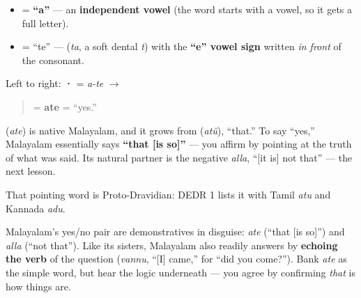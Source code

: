 \begin{itemize}
\raggedright
  \item \textbf{} = \textbf{\textquotedblleft{}a\textquotedblright{}} — an \textbf{independent vowel} (the word starts with a vowel, so it gets a full letter).
  \item \textbf{} = \textquotedblleft{}te\textquotedblright{} — \textbf{} (\emph{ta}, a soft dental \emph{t}) with the \textbf{\textquotedblleft{}e\textquotedblright{} vowel sign} written \emph{in front} of the consonant.
\end{itemize}

Left to right: \textbf{ · } = \emph{a-te} $\to$

\begin{quote}
\textbf{} = \textbf{ate} = \textquotedblleft{}yes.\textquotedblright{}
\end{quote}

\begin{cousinweb}
\textbf{} (\emph{ate}) is native Malayalam, and it grows from \textbf{} (\emph{atŭ}), \textquotedblleft{}that.\textquotedblright{} To say \textquotedblleft{}yes,\textquotedblright{} Malayalam essentially says \textbf{\textquotedblleft{}that {[}is so{]}\textquotedblright{}} — you affirm by pointing at the truth of what was said. Its natural partner is the negative \emph{alla}, \textquotedblleft{}{[}it is{]} not that\textquotedblright{} — the next lesson.

That pointing word is Proto-Dravidian: DEDR 1 lists it with Tamil \emph{atu} and Kannada \emph{adu}.
\end{cousinweb}

\begin{grammarlens}[title={Grammar Lens: yes and no as \textquotedblleft{}that is\textquotedblright{} / \textquotedblleft{}not that\textquotedblright{}}]
Malayalam's yes/no pair are demonstratives in disguise: \emph{ate} (\textquotedblleft{}that {[}is so{]}\textquotedblright{}) and \emph{alla} (\textquotedblleft{}not that\textquotedblright{}). Like its sisters, Malayalam also readily answers by \textbf{echoing the verb} of the question (\emph{vannu}, \textquotedblleft{}{[}I{]} came,\textquotedblright{} for \textquotedblleft{}did you come?\textquotedblright{}). Bank \emph{ate} as the simple word, but hear the logic underneath — you agree by confirming \emph{that} is how things are.
\end{grammarlens}

